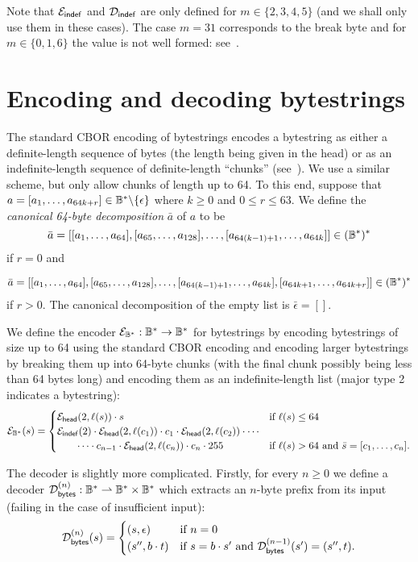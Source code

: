 \noindent Note that $\mathcal{E}_{\mathsf{indef}}$ and $\mathcal{D}_{\mathsf{indef}}$ are only defined for $m \in
\{2,3,4,5\}$ (and we shall only use them in these cases). The case $m=31$
corresponds to the break byte and for $m \in \{0,1,6\}$ the value is not well
formed: see~\cite[3.2.4]{rfc8949-CBOR}.

\section{Encoding and decoding bytestrings}
The standard CBOR encoding of bytestrings encodes a bytestring as either a
definite-length sequence of bytes (the length being given in the head) or as an
indefinite-length sequence of definite-length ``chunks'' (see~\cite[\S\S3.1 and
  3.4.2]{rfc8949-CBOR}).  We use a similar scheme, but only allow chunks of
length up to 64.  To this end, suppose that $a = [a_1, \ldots, a_{64k+r}] \in
\mathbb{B}^*\backslash\{\epsilon\}$ where $k \geq 0$ and $0 \leq r \leq 63$.  We define
the \textit{canonical 64-byte decomposition} $\bar{a}$ of $a$ to be
$$
\bar{a} = [[a_1, \ldots, a_{64}],
  [a_{65}, \ldots, a_{128}] ,\ldots,
  [a_{64(k-1)+1}, \ldots, a_{64k}]] \in (\mathbb{B}^*)^*
$$
\noindent if $r=0$ and

$$
\bar{a} = [[a_1, \ldots, a_{64}],
  [a_{65}, \ldots, a_{128}], \ldots,
  [a_{64(k-1)+1}, \ldots, a_{64k}], [a_{64k+1}, \ldots, a_{64k+r}]] \in (\mathbb{B}^*)^*
$$
\noindent if $r>0$.  The canonical decomposition of the empty list is $\bar{\epsilon} = []$.

\medskip
\noindent We define the encoder $\mathcal{E}_{\mathbb{B}^*}: \mathbb{B}^* \rightarrow \mathbb{B}^*$ for bytestrings by
encoding bytestrings of size up to 64 using the standard CBOR encoding and
encoding larger bytestrings by breaking them up into 64-byte chunks (with the
final chunk possibly being less than 64 bytes long) and encoding them as an
indefinite-length list (major type 2 indicates a bytestring):
$$ \mathcal{E}_{\mathbb{B}^*}(s) =
\begin{cases}
  \mathcal{E}_{\mathsf{head}}(2,\operatorname{\ell}(s)) \cdot s & \text{if $\operatorname{\ell}(s) \leq 64$}\\
  \mathcal{E}_{\mathsf{indef}}(2) \cdot \mathcal{E}_{\mathsf{head}}(2,\operatorname{\ell}(c_1)) \cdot c_1 \cdot \mathcal{E}_{\mathsf{head}}(2,\operatorname{\ell}(c_2)) \cdot \cdots \\
  \qquad  \cdots  \cdot c_{n-1} \cdot \mathcal{E}_{\mathsf{head}}(2,\operatorname{\ell}(c_n)) \cdot c_n \cdot 255
  & \text{if $\operatorname{\ell}(s) > 64$ and $\bar{s} = [c_1, \ldots, c_n]$.}
\end{cases}
$$

\medskip

\noindent The decoder is slightly more complicated.  Firstly, for every $n \geq
0$ we define a decoder $\mathcal{D}_{\mathsf{bytes}}^{(n)}: \mathbb{B}^* \rightharpoonup \mathbb{B}^* \times \mathbb{B}^*$
which extracts an $n$-byte prefix from its input (failing in the case of
insufficient input):
$$
\mathcal{D}_{\mathsf{bytes}}^{(n)}(s) =
\begin{cases}
  (s, \epsilon) & \text{if $n=0$}\\
  (s'', b \cdot t) & \text{if $s = b \cdot s'$ and $\mathcal{D}_{\mathsf{bytes}}^{(n-1)}(s') = (s'', t)$}.
\end{cases}
$$

